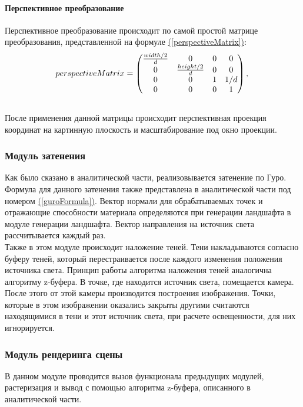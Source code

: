 \documentclass{article}
\begin{document}
	\paragraph{Перспективное преобразование}
	\indent Перспективное преобразование происходит по самой простой матрице преобразования, представленной на формуле \hyperref[perspectiveMatrix]{(\ref{perspectiveMatrix})}:
	\begin{equation}\label{perspectiveMatrix}
		perspectiveMatrix =
		\begin{pmatrix}
		\frac{width / 2}{d} & 0 & 0 & 0\\
		0 & \frac{height / 2}{d} & 0 & 0\\
		0 &0 & 1 & 1 / d\\
		0 & 0 & 0 & 1
		\end{pmatrix},\\
	\end{equation}
	\\ \indent После применения  данной матрицы происходит перспективная проекция координат на картинную плоскость и масштабирование под окно проекции.

	\subsubsection{Модуль затенения}
	\indent Как было сказано в аналитической части, реализовывается затенение по Гуро. Формула для данного затенения также представлена в аналитической части под номером \hyperref[guroFormula]{(\ref{guroFormula})}. Вектор нормали для обрабатываемых точек и отражающие способности материала определяются при генерации ландшафта в модуле генерации ландшафта. Вектор направления на источник света рассчитывается каждый раз.
	\\ \indent Также в этом модуле происходит наложение теней. Тени накладываются согласно буферу теней, который перестраивается после каждого изменения положения источника света. Принцип работы алгоритма наложения теней аналогична алгоритму z-буфера. В точке, где находится источник света, помещается камера. После этого от этой камеры производится построения изображения. Точки, которые в этом изображении оказались закрыты другими считаются находящимися в тени и этот источник света, при расчете освещенности, для них игнорируется.
	\subsubsection{Модуль рендеринга сцены}
	\indent  В данном модуле проводится вызов функционала предыдущих модулей, растеризация и вывод с помощью алгоритма z-буфера, описанного в аналитической части.
\end{document}
